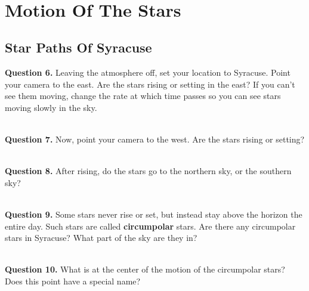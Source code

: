 \documentclass[11pt]{article}
\begin{document}


\hrulefill\\

\section{Motion Of The Stars}

\subsection{Star Paths Of Syracuse}

\textbf{Question 6.} Leaving the atmosphere off, set your location to Syracuse. Point your camera to the east. Are the stars rising or setting in the east? If you can't see them moving, change the rate at which time passes so you can see stars moving slowly in
the sky.\\
\vspace*{1.5cm}

\hrulefill\\


\textbf{Question 7.} Now, point your camera to the west. Are the stars rising or setting?\\
\vspace*{1.5cm}

\hrulefill\\   

\textbf{Question 8.} After rising, do the stars go to the northern sky, or the southern sky?\\
\vspace*{1.5cm}

\hrulefill\\

\textbf{Question 9.} Some stars never rise or set, but instead stay above the horizon the entire day. Such stars are called \textbf{circumpolar} stars. Are there any circumpolar stars in Syracuse? What part of the sky are they in?\\
\vspace*{1.5cm}

\hrulefill\\
\newpage
\textbf{Question 10.} What is at the center of the motion of the circumpolar stars? Does this point have a special name?\\
\vspace*{1.5cm}
\end{document}
